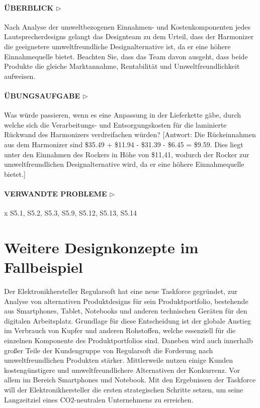 \documentclass[13pt,titlepage]{article}
\begin{document}
\paragraph{\textbf{\"UBERBLICK $\triangleright$}} Nach Analyse der umweltbezogenen Einnahmen- und Kostenkomponenten jedes Lautsprecherdesigns gelangt das Designteam zu dem Urteil, dass der Harmonizer die geeignetere umweltfreundliche Designalternative ist, da er eine höhere Einnahmequelle bietet. Beachten Sie, dass das Team davon ausgeht, dass beide Produkte die gleiche Marktannahme, Rentabilität und Umweltfreundlichkeit aufweisen.
\paragraph{\textbf{\"UBUNGSAUFGABE $\triangleright$}} Was würde passieren, wenn es eine Anpassung in der Lieferkette gäbe, durch welche sich die Verarbeitungs- und Entsorgungskosten für die laminierte Rückwand des Harmonizers verdreifachen würden? [Antwort: Die Rückeinnahmen aus dem Harmonizer sind \$35.49 + \$11.94 - \$31.39 - \$6.45 = \$9.59. Dies liegt unter den Einnahmen des Rockers in Höhe von \$11,41, wodurch der Rocker zur umweltfreundlichen Designalternative wird, da er eine höhere Einnahmequelle bietet.]

\paragraph{\textbf{VERWANDTE PROBLEME $\triangleright$}} x S5.1, S5.2, S5.3, S5.9, S5.12, S5.13, S5.14

\section*{Weitere Designkonzepte im Fallbeispiel} 
Der Elektronikhersteller Regularsoft hat eine neue Taskforce gegründet, zur Analyse von alternativen Produktdesigns für sein Produktportfolio, bestehende aus Smartphones, Tablet, Notebooks und anderen technischen Geräten für den digitalen Arbeitsplatz. Grundlage für diese Entscheidung ist der globale Anstieg im Verbrauch von Kupfer und anderen Rohstoffen, welche essenziell für die einzelnen Komponente des Produktportfolios sind. Daneben wird auch innerhalb großer Teile der Kundengruppe von Regularsoft die Forderung nach umweltfreundlichen Produkten stärker. Mittlerweile nutzen einige Kunden kostengünstigere und umweltfreundlichere Alternativen der Konkurrenz. Vor allem im Bereich Smartphones und Notebook.
Mit den Ergebnissen der Taskforce will der Elektronikhersteller die ersten strategischen Schritte setzen, um seine Langzeitziel eines CO2-neutralen Unternehmens zu erreichen.
\end{document}
